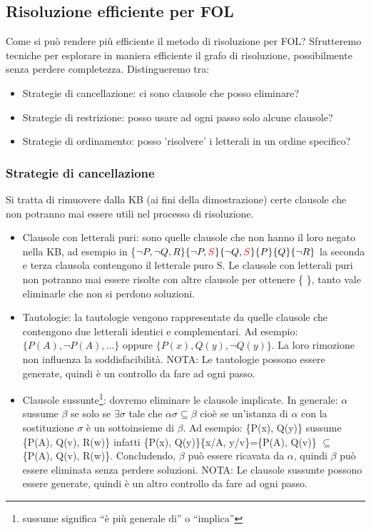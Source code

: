 \documentclass{article}
\begin{document}
\subsection{Risoluzione efficiente per FOL}
Come si può rendere più efficiente il metodo di risoluzione per FOL? Sfrutteremo tecniche per esplorare in maniera efficiente il grafo di risoluzione, possibilmente senza perdere completezza. Distingueremo tra:
\begin{itemize}
    \item Strategie di cancellazione: ci sono clausole che posso eliminare?
    \item Strategie di restrizione: posso usare ad ogni passo solo alcune clausole?
    \item Strategie di ordinamento: posso 'risolvere' i letterali in un ordine specifico?
\end{itemize}
\subsubsection{Strategie di cancellazione}
Si tratta di rimuovere dalla KB (ai fini della dimostrazione) certe clausole che non potranno mai essere utili nel processo di risoluzione.
\begin{itemize}
    \item Clausole con letterali puri: sono quelle clausole che non hanno il loro negato nella KB, ad esempio in \{$\neg P, \neg Q, R\}  \{\neg P, \textcolor{red}{S}\}  \{\neg Q, \textcolor{red}{S}\} \{P\} \{Q\} \{\neg R\}$  la seconda e terza clausola contengono il letterale puro S. Le clausole con letterali puri non potranno mai essere risolte con altre clausole per ottenere \{ \}, tanto vale eliminarle che non si perdono soluzioni.
    \item Tautologie: la tautologie vengono rappresentate da quelle clausole che contengono due letterali identici e complementari. Ad esempio: $\{P(A), \neg P(A), ...\}$ oppure $\{P(x), Q(y), \neg Q(y)\}$. La loro rimozione non influenza la soddisfacibilità. \newline 
    NOTA: Le tautologie possono essere generate, quindi è un controllo da fare ad ogni passo.
    \item Clausole sussunte\footnote{sussume significa “è più generale di” o “implica”}: dovremo eliminare le clausole implicate. In generale: $\alpha$ sussume $\beta$ se solo se $\exists \sigma$ tale che  $\alpha \sigma \subseteq \beta$ cioè se un'istanza di $\alpha$ con la sostituzione $\sigma$ è un sottoinsieme di $\beta$. \newline
    Ad esempio: \{P(x), Q(y)\} sussume \{P(A), Q(v), R(w)\} infatti \newline \{P(x), Q(y)\}\{x/A, y/v\}=\{P(A), Q(v)\} $\subseteq$ \{P(A), Q(v), R(w)\}. \newline 
    Concludendo, $\beta$ può essere ricavata da $\alpha$, quindi $\beta$ può essere eliminata senza perdere soluzioni. \newline 
    NOTA: Le clausole sussunte possono essere generate, quindi è un altro controllo da fare ad ogni passo.
\end{itemize}
\end{document}

